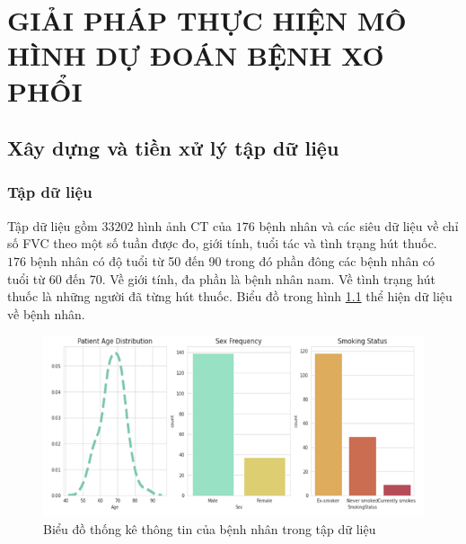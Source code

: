 \chapter{GIẢI PHÁP THỰC HIỆN MÔ HÌNH DỰ ĐOÁN BỆNH XƠ PHỔI}
\section{Xây dựng và tiền xử lý tập dữ liệu}
\subsection{Tập dữ liệu}
Tập dữ liệu gồm $33202$ hình ảnh CT của $176$ bệnh nhân và các siêu dữ liệu về chỉ số FVC theo một số tuần được đo, giới tính, tuổi tác và tình trạng hút thuốc. $176$ bệnh nhân có độ tuổi từ 50 đến 90 trong đó phần đông các bệnh nhân có tuổi từ 60 đến 70. Về giới tính, đa phần là bệnh nhân nam. Về tình trạng hút thuốc là những người đã từng hút thuốc. Biểu đồ trong hình \ref{fig:data1} thể hiện dữ liệu về bệnh nhân.\par
\begin{figure}[ht!]
\centerline{\includegraphics[scale=0.8]{images/data1.png}}
\caption{Biểu đồ thống kê thông tin của bệnh nhân trong tập dữ liệu}
\label{fig:data1}
\end{figure}


